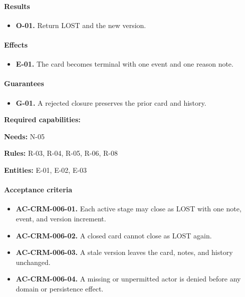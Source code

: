 \documentclass[10pt,a4paper]{article}
\begin{document}
\paragraph{Results}

\begin{itemize}

\item \textbf{O-01.} Return LOST and the new version.

\end{itemize}

\paragraph{Effects}

\begin{itemize}

\item \textbf{E-01.} The card becomes terminal with one event and one reason note.

\end{itemize}

\paragraph{Guarantees}

\begin{itemize}

\item \textbf{G-01.} A rejected closure preserves the prior card and history.

\end{itemize}

\textbf{Required capabilities:} 

\textbf{Needs:} N-05

\textbf{Rules:} R-03, R-04, R-05, R-06, R-08

\textbf{Entities:} E-01, E-02, E-03

\paragraph{Acceptance criteria}

\begin{itemize}

\item \textbf{AC-CRM-006-01.} Each active stage may close as LOST with one note, event, and version increment.

\item \textbf{AC-CRM-006-02.} A closed card cannot close as LOST again.

\item \textbf{AC-CRM-006-03.} A stale version leaves the card, notes, and history unchanged.

\item \textbf{AC-CRM-006-04.} A missing or unpermitted actor is denied before any domain or persistence effect.

\end{itemize}
\end{document}
